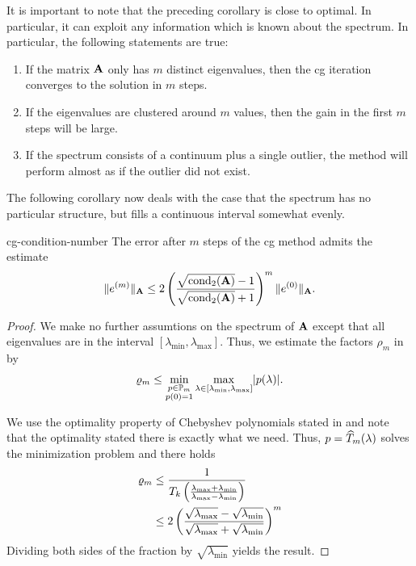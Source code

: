 \begin{remark}
  It is important to note that the preceding corollary is close to
  optimal. In particular, it can exploit any information which is
  known about the spectrum. In particular, the following statements are true:
  \begin{enumerate}
  \item If the matrix $\mathbf A$ only has $m$ distinct eigenvalues, then
    the cg iteration converges to the solution in $m$ steps.
  \item If the eigenvalues are clustered around $m$ values, then the
    gain in the first $m$ steps will be large.
  \item If the spectrum consists of a continuum plus a single outlier,
    the method will perform almost as if the outlier did not exist.
  \end{enumerate}
  The following corollary now deals with the case that the spectrum
  has no particular structure, but fills a continuous interval
  somewhat evenly.
\end{remark}

\begin{Corollary}{cg-condition-number}
  The error after $m$ steps of the cg method admits the estimate
  \begin{gather}
    \lVert e^{(m)}\rVert_{\mathbf A} \le 2 \left(
      \frac{\sqrt{\operatorname{cond}_2(\mathbf A)}-1}{\sqrt{\operatorname{cond}_2(\mathbf A)}+1}\right)^m
    \lVert e^{(0)}\rVert_{\mathbf A}.
  \end{gather}
\end{Corollary}

\begin{proof}
  We make no further assumtions on the spectrum of $\mathbf A$ except that
  all eigenvalues are in the interval
  $[\lambda_{\min},\lambda_{\max}]$. Thus, we estimate the factors $\rho_m$ in  by
  \begin{gather}
    \varrho_m \le \min_{\substack{p\in\mathbb P_m\\p(0) = 1}}
    \max_{\lambda\in[\lambda_{\min},\lambda_{\max}]} \lvert p(\lambda)\rvert.
  \end{gather}
  
  We use the optimality property of Chebyshev polynomials stated in
   and note that the
  optimality stated there is exactly what we need. Thus,
  $p = \widehat{T}_m(\lambda)$ solves the minimization
  problem and there holds
  \begin{align}
    \varrho_m
    &\le \frac1{T_k\left(
      \frac{\lambda_{\max}+\lambda_{\min}}{\lambda_{\max}-\lambda_{\min}}
      \right)}\\
    & \le 2 \left(\frac{\sqrt{\lambda_{\max}}-\sqrt{\lambda_{\min}}}{\sqrt{\lambda_{\max}}+\sqrt{\lambda_{\min}}}
      \right)^m
  \end{align}
  Dividing both sides of the fraction by $\sqrt{\lambda_{\min}}$ yields the result.
\end{proof}

